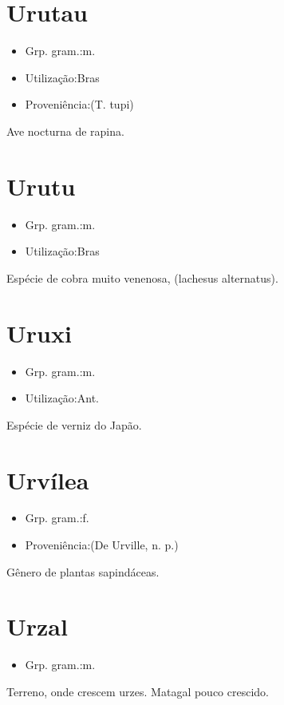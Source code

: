 \documentclass{article}
\begin{document}
\section{Urutau}
\begin{itemize}
\item {Grp. gram.:m.}
\end{itemize}
\begin{itemize}
\item {Utilização:Bras}
\end{itemize}
\begin{itemize}
\item {Proveniência:(T. tupi)}
\end{itemize}
Ave nocturna de rapina.
\section{Urutu}
\begin{itemize}
\item {Grp. gram.:m.}
\end{itemize}
\begin{itemize}
\item {Utilização:Bras}
\end{itemize}
Espécie de cobra muito venenosa, (\textunderscore lachesus alternatus\textunderscore ).
\section{Uruxi}
\begin{itemize}
\item {Grp. gram.:m.}
\end{itemize}
\begin{itemize}
\item {Utilização:Ant.}
\end{itemize}
Espécie de verniz do Japão.
\section{Urvílea}
\begin{itemize}
\item {Grp. gram.:f.}
\end{itemize}
\begin{itemize}
\item {Proveniência:(De \textunderscore Urville\textunderscore , n. p.)}
\end{itemize}
Gênero de plantas sapindáceas.
\section{Urzal}
\begin{itemize}
\item {Grp. gram.:m.}
\end{itemize}
Terreno, onde crescem urzes.
Matagal pouco crescido.
\end{document}
